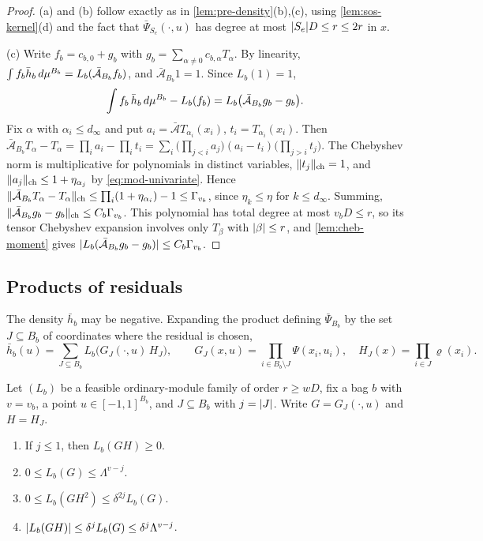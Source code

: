 \begin{proof}
(a) and (b) follow exactly as in \cref{lem:pre-density}(b),(c), using
\cref{lem:sos-kernel}(d) and the fact that $\bar\Psi_{S_e}(\cdot,u)$ has
degree at most $\lvert S_e\rvert D\le r\le2r$ in $x$.

(c) Write $f_b=c_{b,0}+g_b$ with $g_b=\sum_{\alpha\ne0}c_{b,\alpha}T_\alpha$.
By linearity, $\int f_b\bar h_b\,d\mu^{B_b}=L_b(\bar{\mathcal
A}_{B_b}f_b)$, and $\bar{\mathcal A}_{B_b}1=1$. Since $L_b(1)=1$,
\[
  \int f_b\,\bar h_b\,d\mu^{B_b}-L_b(f_b)
  =L_b\bigl(\bar{\mathcal A}_{B_b}g_b-g_b\bigr).
\]
Fix $\alpha$ with $\alpha_i\le d_\infty$ and put
$a_i=\bar{\mathcal A}T_{\alpha_i}(x_i)$, $t_i=T_{\alpha_i}(x_i)$. Then
$\bar{\mathcal A}_{B_b}T_\alpha-T_\alpha=\prod_ia_i-\prod_it_i=
\sum_i\bigl(\prod_{j<i}a_j\bigr)(a_i-t_i)\bigl(\prod_{j>i}t_j\bigr)$. The
Chebyshev norm is multiplicative for polynomials in distinct variables,
$\lVert t_j\rVert_{\mathrm{ch}}=1$, and $\lVert a_j\rVert_{\mathrm{ch}}\le1+\eta_{\alpha_j}$ by
\eqref{eq:mod-univariate}. Hence
$\lVert \bar{\mathcal A}_{B_b}T_\alpha-T_\alpha\rVert_{\mathrm{ch}}\le
\prod_i(1+\eta_{\alpha_i})-1\le\Gamma_{v_b}$, since
$\eta_k\le\eta$ for $k\le d_\infty$. Summing,
$\lVert \bar{\mathcal A}_{B_b}g_b-g_b\rVert_{\mathrm{ch}}\le C_b\Gamma_{v_b}$. This
polynomial has total degree at most $v_bD\le r$, so its tensor Chebyshev
expansion involves only $T_\beta$ with $\lvert \beta\rvert\le r$, and
\cref{lem:cheb-moment} gives $\lvert L_b(\bar{\mathcal A}_{B_b}g_b-g_b)\rvert\le
C_b\Gamma_{v_b}$.
\end{proof}

\subsection{Products of residuals}\label{sec:mod-residual}

The density $\bar h_b$ may be negative. Expanding the product defining
$\bar\Psi_{B_b}$ by the set $J\subseteq B_b$ of coordinates where the
residual is chosen,
\begin{equation}\label{eq:mod-expansion}
  \bar h_b(u)=\sum_{J\subseteq B_b}L_b\bigl(G_J(\cdot,u)\,H_J\bigr),\qquad
  G_J(x,u)=\prod_{i\in B_b\setminus J}\Psi(x_i,u_i),\quad
  H_J(x)=\prod_{i\in J}\varrho(x_i).
\end{equation}

\begin{lemma}\label{lem:residual-products}
Let $(L_b)$ be a feasible ordinary-module family of order $r\ge wD$, fix a
bag $b$ with $v=v_b$, a point $u\in[-1,1]^{B_b}$, and $J\subseteq B_b$ with
$j=\lvert J\rvert$. Write $G=G_J(\cdot,u)$ and $H=H_J$.
\begin{enumerate}[label=(\alph*)]
\item If $j\le1$, then $L_b(GH)\ge0$.
\item $0\le L_b(G)\le\Lambda^{v-j}$.
\item $0\le L_b(GH^2)\le\delta^{2j}L_b(G)$.
\item $\lvert L_b(GH)\rvert\le\delta^jL_b(G)\le\delta^j\Lambda^{v-j}$.
\end{enumerate}
\end{lemma}

